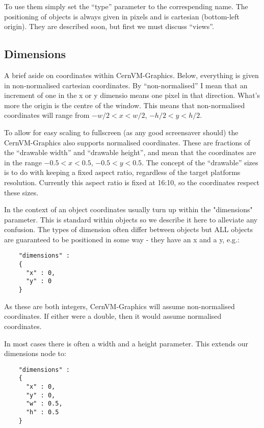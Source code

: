 \documentclass[a4paper]{article}
\newcommand{\cernvmgraphics}{CernVM-Graphics}
\begin{document}
  To use them simply set the ``type'' parameter to the correspending name.
  The positioning of objects is always given in pixels and is cartesian
  (bottom-left origin).
  They are described soon, but first we must discuss ``views''.

  \subsection{Dimensions}
  A brief aside on coordinates within \cernvmgraphics{}. Below,
  everything is given in non-normalised cartesian coordinates. By
  ``non-normalised'' I mean that an increment of one in the x or y dimensio
  means one pixel in that direction. What's more the origin is the centre
  of the window. This means that non-normalised coordinates will range from
  $-w/2 < x < w/2$, $-h/2 < y < h/2$.

  To allow for easy scaling to fullscreen (as any good screensaver should)
  the \cernvmgraphics{} also supports normalised coordinates. These are 
  fractions of the ``drawable width'' and ``drawable height'', and mean 
  that the coordinates are in the range $-0.5 < x < 0.5$, $-0.5 < y < 0.5$.
  The concept of the ``drawable'' sizes is to do with keeping a fixed aspect
  ratio, regardless of the target platforms resolution. Currently this 
  aspect ratio is fixed at 16:10, so the coordinates respect these sizes.

  In the context of an object coordinates usually turn up within the
  "dimensions" parameter. This is standard within objects so we describe it
  here to alleviate any confusion. The types of dimension often differ
  between objects but ALL objects are guaranteed to be positioned in some
  way - they have an x and a y, e.g.:

  \begin{verbatim}
    "dimensions" :
    {
      "x" : 0,
      "y" : 0
    }
  \end{verbatim}

  As these are both integers, \cernvmgraphics{} will assume non-normalised
  coordinates. If either were a double, then it would assume normalised
  coordinates. 
  
  In most cases there is often a width and a height parameter. This extends
  our dimensions node to:

  \begin{verbatim}
    "dimensions" :
    {
      "x" : 0,
      "y" : 0,
      "w" : 0.5,
      "h" : 0.5
    }
  \end{verbatim}
\end{document}
